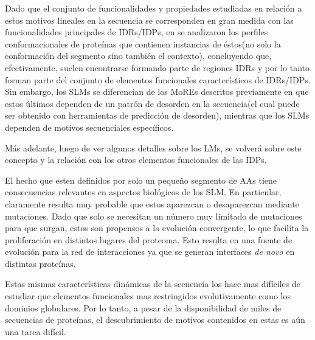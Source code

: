 Dado que el conjunto de funcionalidades y propiedades estudiadas en relación a estos motivos lineales en la secuencia se corresponden en gran medida con las funcionalidades principales de IDRs/IDPs, en \cite{fuxreiter2007local} se
analizaron los perfiles conformacionales de proteínas que contienen instancias de éstos(no solo la conformación del segmento sino también el contexto), concluyendo que, efectivamente, 
suelen encontrarse formando parte de regiones IDRs y por lo tanto forman parte del conjunto de elementos funcionales característicos de IDRs/IDPs.
Sin embargo, los SLMs se diferencian de los MoREs descritos previamente en que estos últimos dependen de un patrón de desorden en la secuencia(el cual puede ser obtenido con herramientas de predicción de desorden), 
mientras que los SLMs dependen de motivos secuenciales específicos.

Más adelante, luego de ver algunos detalles sobre los LMs, se volverá sobre este concepto y la relación con los otros elementos funcionales de las IDPs.


El hecho que esten definidos por solo un pequeño segmento de AAs tiene consecuencias relevantes en aspectos biológicos de los SLM.
En particular, claramente resulta muy probable que estos aparezcan o desaparezcan mediante mutaciones. 
Dado que solo se necesitan un número muy limitado de mutaciones para que surgan, estos son propensos a la evolución convergente, lo que facilita la proliferación en distintos lugares del proteoma.
Esto resulta en una fuente de evolución para la red de interacciones ya que se generan interfaces \textit{de novo} en distintas proteínas.

Estas mismas características dinámicas de la secuencia los hace mas difíciles de estudiar que elementos funcionales mas restringidos evolutivamente como los dominios globulares.
Por lo tanto, a pesar de la disponibilidad de miles de secuencias de proteínas, el descubrimiento de motivos contenidos en estas es aún una tarea difícil.


